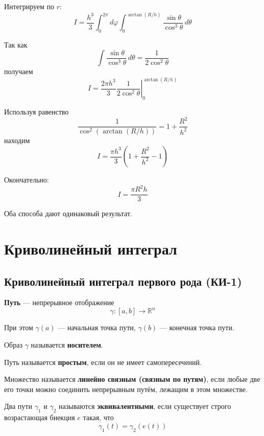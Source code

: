 \documentclass[12pt,a4paper]{article}
\begin{document}
\begin{example}
Интегрируем по $r$:
\[
I=
\frac{h^3}{3}
\int_0^{2\pi}d\varphi
\int_0^{\arctan(R/h)}
\frac{\sin\theta}{\cos^3\theta}\,d\theta
\]

Так как
\[
\int\frac{\sin\theta}{\cos^3\theta}\,d\theta
=\frac{1}{2\cos^2\theta}
\]
получаем
\[
I=
\frac{2\pi h^3}{3}
\left.
\frac{1}{2\cos^2\theta}
\right|_0^{\arctan(R/h)}
\]

Используя равенство
\[
\frac{1}{\cos^2(\arctan(R/h))}
=1+\frac{R^2}{h^2}
\]
находим
\[
I=
\frac{\pi h^3}{3}
\left(1+\frac{R^2}{h^2}-1\right)
\]

Окончательно:
\[
I=\frac{\pi R^2h}{3}
\]

Оба способа дают одинаковый результат.
\end{example}

\newpage

\section{Криволинейный интеграл}

\subsection{Криволинейный интеграл первого рода (КИ-1)}

\begin{definition}
\textbf{Путь} — непрерывное отображение
\[
\gamma \colon [a,b] \to \mathbb{R}^n
\]

При этом $\gamma(a)$ — начальная точка пути, $\gamma(b)$ — конечная точка пути.

Образ $\gamma$ называется \textbf{носителем}.

\end{definition}

\begin{definition}
Путь называется \textbf{простым}, если он не имеет самопересечений.
\end{definition}

\begin{definition}
Множество называется \textbf{линейно связным (связным по путям)}, если любые две его точки можно соединить непрерывным путём, лежащим в этом множестве.
\end{definition}

\begin{definition}
Два пути $\gamma_1$ и $\gamma_2$ называются \textbf{эквивалентными}, если существует строго возрастающая биекция $e$ такая, что
\[
\gamma_1(t)=\gamma_2(e(t))
\]
\end{definition}
\end{document}
